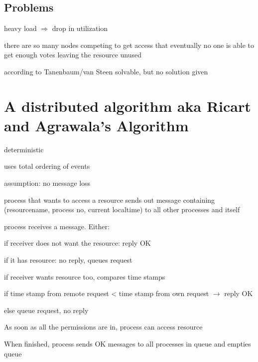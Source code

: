 \documentclass[ngerman,a4paper]{report}
\begin{document}
\subsection*{Problems}
\begin{compactitem}
	\item heavy load $\Rightarrow$ drop in utilization
	\item there are so many nodes competing to get access that eventually no one is able to get enough votes leaving the resource unused 	\item according to Tanenbaum/van Steen solvable, but no solution given
\end{compactitem}

\section{A distributed algorithm aka Ricart and Agrawala's Algorithm}

\begin{compactitem}
	\item deterministic
	\item uses total ordering of events
	\item assumption: no message loss
\end{compactitem}


\begin{compactitem}
	
	\item process that wants to access a resource sends out message containing (resourcename, process no, current localtime) to all other processes and itself
	\item process receives a message. Either:
		\begin{compactenum}
			\item if receiver does not want the resource: reply OK 
			\item if it has resource: no reply, queues request
			\item if receiver wants resource too, compares time stamps
			\begin{compactitem}
				\item if time stamp from remote request < time stamp from own request $\rightarrow$ reply OK
				\item else queue request, no reply
			\end{compactitem}	
			\item As soon as all the permissions are in, process can access resource 
			\item When finished, process sends OK messages to all processes in queue and empties queue		
		\end{compactenum}
\end{compactitem}
\end{document}
